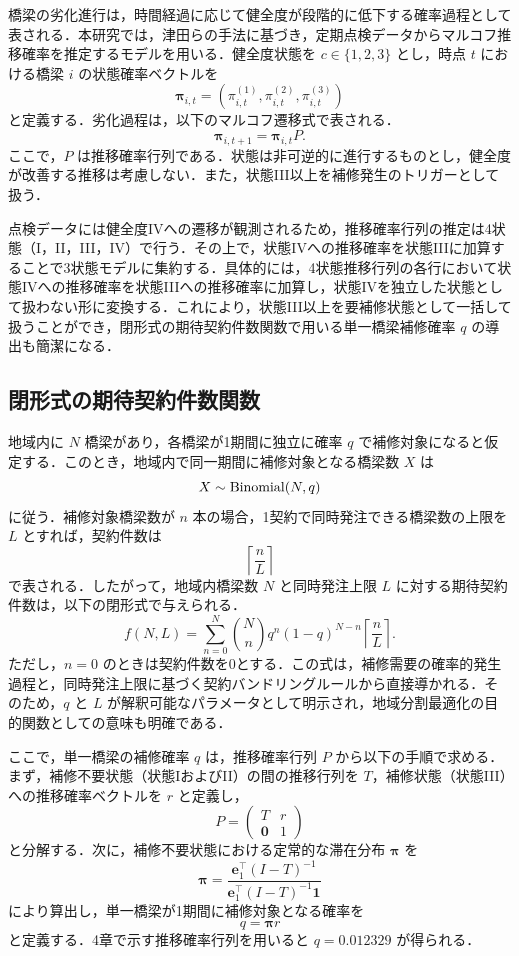 \documentclass[Journal,letterpaper,InsideFigs,NoLineNumbers]{ascelike-new}
\begin{document}
橋梁の劣化進行は，時間経過に応じて健全度が段階的に低下する確率過程として表される．本研究では，津田ら\cite{tsuda2005}の手法に基づき，定期点検データからマルコフ推移確率を推定するモデルを用いる．健全度状態を \(c\in\{1,2,3\}\) とし，時点 \(t\) における橋梁 \(i\) の状態確率ベクトルを
\[
{\mathbf \pi}_{i,t}
=
\left(
\pi_{i,t}^{(1)},\pi_{i,t}^{(2)},\pi_{i,t}^{(3)}
\right)
\]
と定義する．劣化過程は，以下のマルコフ遷移式で表される．
\[
{\mathbf \pi}_{i,t+1}
=
{\mathbf \pi}_{i,t}P .
\]
ここで，\(P\) は推移確率行列である．状態は非可逆的に進行するものとし，健全度が改善する推移は考慮しない．また，状態III以上を補修発生のトリガーとして扱う．

点検データには健全度IVへの遷移が観測されるため，推移確率行列の推定は4状態（I，II，III，IV）で行う．その上で，状態IVへの推移確率を状態IIIに加算することで3状態モデルに集約する．具体的には，4状態推移行列の各行において状態IVへの推移確率を状態IIIへの推移確率に加算し，状態IVを独立した状態として扱わない形に変換する．これにより，状態III以上を要補修状態として一括して扱うことができ，閉形式の期待契約件数関数で用いる単一橋梁補修確率 \(q\) の導出も簡潔になる．

\subsection{閉形式の期待契約件数関数}

地域内に \(N\) 橋梁があり，各橋梁が1期間に独立に確率 \(q\) で補修対象になると仮定する．このとき，地域内で同一期間に補修対象となる橋梁数 \(X\) は
\[
X \sim {\rm Binomial}(N,q)
\]
に従う．補修対象橋梁数が \(n\) 本の場合，1契約で同時発注できる橋梁数の上限を \(L\) とすれば，契約件数は
\[
\left\lceil \frac{n}{L} \right\rceil
\]
で表される．したがって，地域内橋梁数 \(N\) と同時発注上限 \(L\) に対する期待契約件数は，以下の閉形式で与えられる．
\[
f(N,L)
=
\sum_{n=0}^{N}
{N\choose n}q^n(1-q)^{N-n}
\left\lceil \frac{n}{L} \right\rceil .
\]
ただし，\(n=0\) のときは契約件数を0とする．この式は，補修需要の確率的発生過程と，同時発注上限に基づく契約バンドリングルールから直接導かれる．そのため，\(q\) と \(L\) が解釈可能なパラメータとして明示され，地域分割最適化の目的関数としての意味も明確である．

ここで，単一橋梁の補修確率 \(q\) は，推移確率行列 \(P\) から以下の手順で求める．まず，補修不要状態（状態IおよびII）の間の推移行列を \(T\)，補修状態（状態III）への推移確率ベクトルを \(r\) と定義し，
\[
P =
\begin{pmatrix}
T & r \\
\boldsymbol{0} & 1
\end{pmatrix}
\]
と分解する．次に，補修不要状態における定常的な滞在分布 \(\boldsymbol{\pi}\) を
\[
\boldsymbol{\pi}
=
\frac{\boldsymbol{e}_1^\top (I-T)^{-1}}
{\boldsymbol{e}_1^\top (I-T)^{-1} \boldsymbol{1}}
\]
により算出し，単一橋梁が1期間に補修対象となる確率を
\[
q = \boldsymbol{\pi} r
\]
と定義する．4章で示す推移確率行列を用いると \(q=0.012329\) が得られる．
\end{document}
